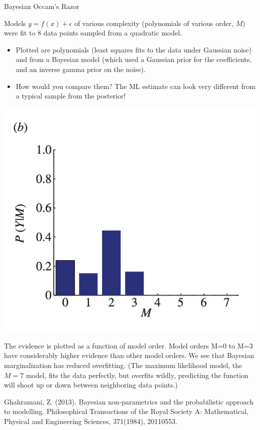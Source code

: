 \documentclass[10pt]{beamer}
\begin{document}
\begin{frame}{Bayesian Occam's Razor}
\begin{minipage}[t]{.47\textwidth}
Models $y = f(x) + \epsilon$ of  various complexity  \tiny (polynomials of various order, $M$) \scriptsize were fit to 8 data points sampled from a quadratic model. 
	\begin{itemize}
	\scriptsize
	\item  Plotted are   polynomials \tiny (least squares fits to the data under Gaussian noise) \scriptsize and  from a Bayesian model \tiny (which used a Gaussian prior for the coefficients, and an inverse gamma prior on the noise). \scriptsize 
	\item How would you compare them?  \pause  The ML estimate can look very different from a typical sample from the posterior!  
	\end{itemize}
\end{minipage} 
\hfill  \pause
\begin{minipage}[t]{.47\textwidth}
\begin{center}
\includegraphics[width=.7\textwidth]{images/occams_razor_b}
\end{center}
The evidence is plotted as a function of model order.  Model orders M=0 to M=3 have considerably higher evidence than other model orders.  We see that Bayesian marginalization has reduced overfitting.   (The maximum likelihood model, the $M=7$ model, fits the data perfectly, but overfits wildly, predicting the function will shoot up or down between neighboring data points.) 
\end{minipage}
\vfill

\hfill \tiny Ghahramani, Z. (2013). Bayesian non-parametrics and the probabilistic approach to modelling. Philosophical Transactions of the Royal Society A: Mathematical, Physical and Engineering Sciences, 371(1984), 20110553.
\end{frame}
\end{document}
